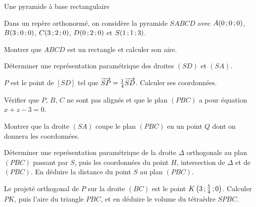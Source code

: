 \begin{exercice}[3]{Une pyramide à base rectangulaire}
\begin{codecote}[0.56]
Dans un repère orthonormé, on considère la pyramide $SABCD$ avec $A(0\,{;}\,0\,{;}\,0)$, $B(3\,{;}\,0\,{;}\,0)$, $C(3\,{;}\,2\,{;}\,0)$, $D(0\,{;}\,2\,{;}\,0)$ et
$S(1\,{;}\,1\,{;}\,3)$.
\begin{questions}
  \item Montrer que $ABCD$ est un rectangle et calculer son aire.
  \item Déterminer une représentation paramétrique des droites $(SD)$ et $(SA)$.
  \item $P$ est le point de $[SD]$ tel que $\overrightarrow{SP}=\frac14\overrightarrow{SD}$. Calculer ses coordonnées.
  \item Vérifier que $P$, $B$, $C$ ne sont pas alignés et que le plan $(PBC)$ a pour équation $x+z-3=0$.
\end{questions}
\cote
\centering
{}
\end{codecote}
\begin{questions}[start=5]
  \item Montrer que la droite $(SA)$ coupe le plan $(PBC)$ en un point $Q$ dont on donnera les coordonnées.
  \item Déterminer une représentation paramétrique de la droite $\Delta$ orthogonale au plan $(PBC)$ passant par $S$, puis les
    coordonnées du point $H$, intersection de $\Delta$ et de $(PBC)$. En déduire la distance du point $S$ au plan $(PBC)$.
  \item Le projeté orthogonal de $P$ sur la droite $(BC)$ est le point $K\left(3\,{;}\,\frac54\,{;}\,0\right)$. Calculer $PK$, puis l'aire du
    triangle $PBC$, et en déduire le volume du tétraèdre $SPBC$.
\end{questions}
\end{exercice}

